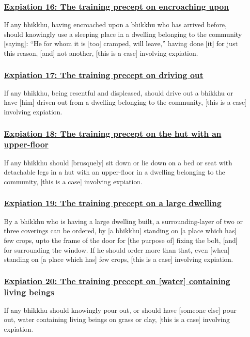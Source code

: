 \subsubsection*{\hyperref[pac16]{Expiation 16: The training precept on encroaching upon}}
\label{exp16}
If any bhikkhu, having encroached upon a bhikkhu who has arrived before, should knowingly use a sleeping place in a dwelling belonging to the community [saying]: ``He for whom it is [too] cramped, will leave,'' having done [it] for just this reason, [and] not another, [this is a case] involving expiation.

\subsubsection*{\hyperref[pac17]{Expiation 17: The training precept on driving out}}
\label{exp17}
If any bhikkhu, being resentful and displeased, should drive out a bhikkhu or have [him] driven out from a dwelling belonging to the community, [this is a case] involving expiation.

\subsubsection*{\hyperref[pac18]{Expiation 18: The training precept on the hut with an upper-floor}}
\label{exp18}
If any bhikkhu should [brusquely] sit down or lie down on a bed or seat with detachable legs in a hut with an upper-floor in a dwelling belonging to the community, [this is a case] involving expiation.

\subsubsection*{\hyperref[pac19]{Expiation 19: The training precept on a large dwelling}}
\label{exp19}
By a bhikkhu who is having a large dwelling built, a surrounding-layer of two or three coverings can be ordered, by [a bhikkhu] standing on [a place which has] few crops, upto the frame of the door for [the purpose of] fixing the bolt, [and] for surrounding the window. If he should order more than that, even [when] standing on [a place which has] few crops, [this is a case] involving expiation.

\subsubsection*{\hyperref[pac20]{Expiation 20: The training precept on [water] containing living beings}}
\label{exp20}
If any bhikkhu should knowingly pour out, or should have [someone else] pour out, water containing living beings on grass or clay, [this is a case] involving expiation.

